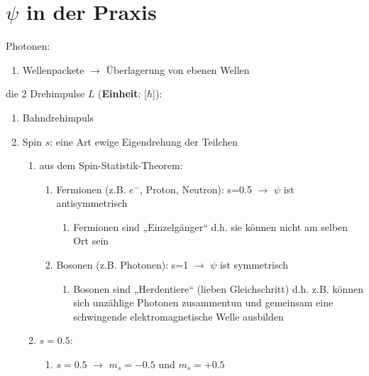 \section{$\psi$ in der Praxis}
Photonen:
\begin{enumerate}
    \item Wellenpackete $\rightarrow$ Überlagerung von ebenen Wellen
\end{enumerate}

die 2 Drehimpulse $L$ (\textbf{Einheit}: [$\hbar$]):
\begin{enumerate}
    \item Bahndrehimpuls
    \item Spin $s$: eine Art ewige Eigendrehung der Teilchen
\begin{enumerate}
    \item aus dem Spin-Statistik-Theorem:
\begin{enumerate}
    \item Fermionen (z.B. $e^-$, Proton, Neutron): s=0.5  $\rightarrow$ $\psi$ ist antisymmetrisch
    \begin{enumerate}
        \item Fermionen sind „Einzelgänger“ d.h. sie können nicht am selben Ort sein
    \end{enumerate}
    \item Bosonen (z.B. Photonen): s=1 $\rightarrow$ $\psi$ ist symmetrisch 
    \begin{enumerate}
        \item Bosonen sind „Herdentiere“ (lieben Gleichschritt) d.h. z.B.  können sich unzählige
        Photonen zusammentun und gemeinsam eine schwingende elektromagnetische Welle ausbilden 
    \end{enumerate}
\end{enumerate}
\item $s=0.5$:
\begin{enumerate}
    \item $s=0.5$ $\rightarrow$ $m_s=-0.5$ und $m_s=+0.5$
\end{enumerate}
\end{enumerate}
\end{enumerate}
